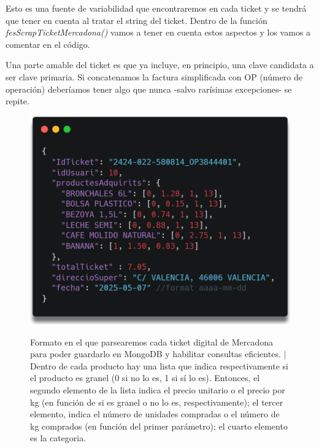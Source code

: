 \documentclass[a4paper,12pt]{report}
\begin{document}
		Esto es una fuente de variabilidad que encontraremos en cada ticket y se tendrá que tener en cuenta al tratar el string del ticket. Dentro de la función \textit{fesScrapTicketMercadona()} vamos a tener en cuenta estos aspectos y los vamos a comentar en el código.
		
		Una parte amable del ticket es que ya incluye, en principio, una clave candidata a ser clave primaria. Si concatenamos la factura simplificada con OP (número de operación) deberíamos tener algo que nunca -salvo rarísimas excepciones- se repite.
		
		
		
		
		\FloatBarrier
		\setlength{\belowcaptionskip}{3pt}
		\begin{figure}[H]
			\centering
			\caption{Formato en el que parsearemos cada ticket digital de Mercadona para poder guardarlo en MongoDB y habilitar consultas eficientes. $|$Dentro de cada producto hay una lista que indica respectivamente si el producto es granel (0 si no lo es, 1 si sí lo es). Entonces, el segundo elemento de la lista indica el precio unitario o el precio por kg (en función de si es granel o no lo es, respectivamente); el tercer elemento, indica el número de unidades compradas o el número de kg comprados (en función del primer parámetro); el cuarto elemento es la categoria.}
			\includegraphics[width=.8\linewidth]{img/ticketJsonEstructuratMostra}
			\label{fig:ticketJsonEstructuratMostra}
		\end{figure}
		\FloatBarrier
\end{document}
